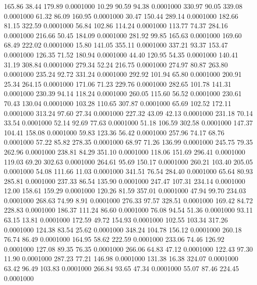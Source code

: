  165.86   38.44  179.89   0.0001000
  10.29   90.59   94.38   0.0001000
 330.97   90.05  339.08   0.0001000
  61.32   86.09  160.95   0.0001000
  30.47  150.44  289.14   0.0001000
 182.66   81.15  322.59   0.0001000
  56.84  102.86  114.24   0.0001000
 113.77   74.37  284.16   0.0001000
 216.66   50.45  184.09   0.0001000
 281.92   99.85  165.63   0.0001000
 169.60   68.49  222.02   0.0001000
  15.80  141.05  355.11   0.0001000
 337.21   93.37  153.47   0.0001000
 126.35   71.52  180.94   0.0001000
  44.40  120.95   54.35   0.0001000
 140.41   31.19  308.84   0.0001000
 279.34   52.24  216.75   0.0001000
 274.97   80.87  263.80   0.0001000
 235.24   92.72  331.24   0.0001000
 292.92  101.94   65.80   0.0001000
 200.91   25.34  264.15   0.0001000
 171.06   71.23  229.76   0.0001000
 282.65  101.78  141.31   0.0001000
 230.39   94.14  118.24   0.0001000
 260.05  115.60   56.52   0.0001000
 230.61   70.43  130.04   0.0001000
 103.28  110.65  307.87   0.0001000
  65.69  102.52  172.11   0.0001000
 313.24   97.60   27.34   0.0001000
 227.32   43.09   42.13   0.0001000
 231.18   70.14   33.54   0.0001000
  52.14   92.69   77.63   0.0001000
  51.18  106.59  302.58   0.0001000
 147.37  104.41  158.08   0.0001000
  59.83  123.36   56.42   0.0001000
 257.96   74.17   68.76   0.0001000
  57.22   85.82  278.35   0.0001000
  68.97   71.26  136.99   0.0001000
 245.75   79.35  262.96   0.0001000
 238.81   84.29  351.10   0.0001000
 118.06  151.69  296.41   0.0001000
 119.03   69.20  302.63   0.0001000
 264.61   95.69  150.17   0.0001000
 260.21  103.40  205.05   0.0001000
  54.08  111.66   11.03   0.0001000
 341.51   76.54  284.40   0.0001000
  65.64   80.93  285.81   0.0001000
 237.33   86.54  135.90   0.0001000
 247.47  107.31  234.14   0.0001000
  12.00  158.61  159.29   0.0001000
 120.26   81.59  357.01   0.0001000
  47.94   99.70  234.03   0.0001000
 268.63   74.99    8.91   0.0001000
 276.33   97.57  328.51   0.0001000
 169.42   84.72  228.83   0.0001000
 186.37  111.24   86.60   0.0001000
  76.08   94.54   51.36   0.0001000
  93.11   63.15   13.81   0.0001000
 172.59   49.72  154.93   0.0001000
 102.55  103.34  317.26   0.0001000
 124.38   83.54   25.62   0.0001000
 348.24  104.78  156.12   0.0001000
 260.18   76.74   86.49   0.0001000
 164.95   58.62  222.59   0.0001000
 233.06   74.46  126.92   0.0001000
 127.08   89.35   76.35   0.0001000
 266.06   64.83   47.12   0.0001000
 122.43   97.30   11.90   0.0001000
 287.23   77.21  146.98   0.0001000
 131.38   16.38  324.07   0.0001000
  63.42   96.49  103.83   0.0001000
 266.84   93.65   47.34   0.0001000
  55.07   87.46  224.45   0.0001000
